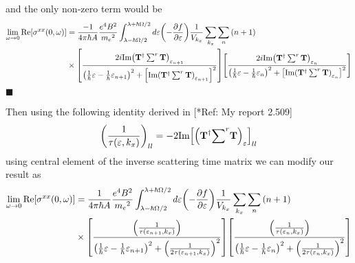 and the only non-zero term would be
\begin{equation} \label{7.8}
  \begin{aligned}
    \lim_{\omega \to 0}
    \text{Re}[{\sigma}^{xx}(0,\omega)] & =
    \frac{-1}{4\pi\hbar A}
    \frac{e^4B^2}{{{m_e}^2}}
    \int_{\lambda-\hbar\Omega/2}^{\lambda+ \hbar\Omega/2} d\varepsilon
    \qty(
    -\frac{\partial f}{\partial \varepsilon})
    \frac{1}{V_{k_x}} \sum_{k_x} \sum_{n}
    \qty(n+1)
    \\
    & \times
    \qty[
    \frac{2i \text{Im}\qty(\mathbf{T}^{\dagger} \sum^r \mathbf{T})_{\varepsilon_{n+1}}
    }
    {
    \qty(
    \frac{1}{\hbar}\varepsilon -
    \frac{1}{\hbar}\varepsilon_{n+1}
    )^2
    + \qty[\text{Im}\qty(\mathbf{T}^{\dagger} \sum^r \mathbf{T})_{\varepsilon_{n+1}}]^2
    }]
    \qty[
    \frac{2i \text{Im}\qty(\mathbf{T}^{\dagger} \sum^r \mathbf{T})_{\varepsilon_{n}}
    }
    {
    \qty(
    \frac{1}{\hbar}\varepsilon -
    \frac{1}{\hbar}\varepsilon_{n}
    )^2
    + \qty[\text{Im}\qty(\mathbf{T}^{\dagger} \sum^r \mathbf{T})_{\varepsilon_{n}}]^2
    }]
  \end{aligned}
\end{equation}
\hfill$\blacksquare$

\noindent
Then using the following identity derived in [*Ref: My report 2.509]
\begin{equation} \label{7.9}
  \qty(\frac{1}{\tau(\varepsilon,k_x)})_{ll} =
  -2\text{Im}\qty[\qty(\mathbf{T}^{\dagger} {\sum}^r \mathbf{T})_{\varepsilon}]_{ll}
\end{equation}
using central element of the inverse scattering time matrix we can modify our result as
\begin{equation} \label{7.10}
  \begin{aligned}
    \lim_{\omega \to 0}
    \text{Re}[{\sigma}^{xx}(0,\omega)] & =
    \frac{1}{4\pi\hbar A}
    \frac{e^4B^2}{{{m_e}^2}}
    \int_{\lambda-\hbar\Omega/2}^{\lambda+ \hbar\Omega/2} d\varepsilon
    \qty(
    -\frac{\partial f}{\partial \varepsilon})
    \frac{1}{V_{k_x}} \sum_{k_x} \sum_{n}
    \qty(n+1)
    \\
    & \times
    \qty[
    \frac{\qty(\frac{1}{\tau(\varepsilon_{n+1},k_x)})
    }
    {
    \qty(
    \frac{1}{\hbar}\varepsilon -
    \frac{1}{\hbar}\varepsilon_{n+1}
    )^2
    + \qty(\frac{1}{2\tau(\varepsilon_{n+1},k_x)})^2
    }]
    \qty[
    \frac{\qty(\frac{1}{\tau(\varepsilon_{n},k_x)})
    }
    {
    \qty(
    \frac{1}{\hbar}\varepsilon -
    \frac{1}{\hbar}\varepsilon_{n}
    )^2
    + \qty(\frac{1}{2\tau(\varepsilon_{n},k_x)})^2
    }]
  \end{aligned}
\end{equation}

